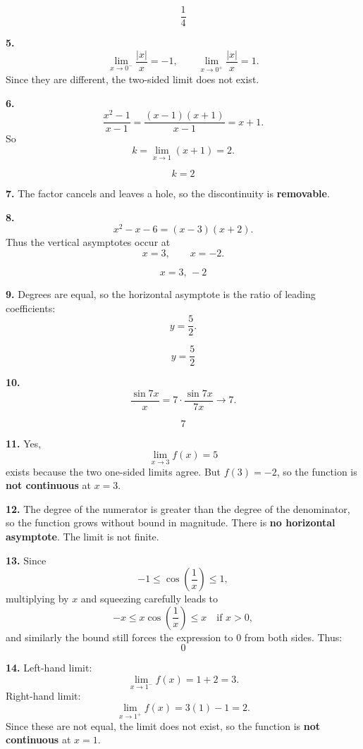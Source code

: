 \documentclass[11pt]{article}
\begin{document}
\[
\boxed{\frac14}
\]

\bigskip

\textbf{5.}
\[
\lim_{x\to 0^-}\frac{|x|}{x}=-1,
\qquad
\lim_{x\to 0^+}\frac{|x|}{x}=1.
\]
Since they are different, the two-sided limit does not exist.

\bigskip

\textbf{6.}
\[
\frac{x^2-1}{x-1}=\frac{(x-1)(x+1)}{x-1}=x+1.
\]
So
\[
k=\lim_{x\to 1}(x+1)=2.
\]

\[
\boxed{k=2}
\]

\bigskip

\textbf{7.}
The factor cancels and leaves a hole, so the discontinuity is \textbf{removable}.

\bigskip

\textbf{8.}
\[
x^2-x-6=(x-3)(x+2).
\]
Thus the vertical asymptotes occur at
\[
x=3,\qquad x=-2.
\]

\[
\boxed{x=3,\,-2}
\]

\bigskip

\textbf{9.}
Degrees are equal, so the horizontal asymptote is the ratio of leading coefficients:
\[
y=\frac52.
\]

\[
\boxed{y=\frac52}
\]

\bigskip

\textbf{10.}
\[
\frac{\sin 7x}{x}
=
7\cdot\frac{\sin 7x}{7x}\to 7.
\]

\[
\boxed{7}
\]

\bigskip

\textbf{11.}
Yes,
\[
\lim_{x\to 3}f(x)=5
\]
exists because the two one-sided limits agree. But $f(3)=-2$, so the function is \textbf{not continuous} at $x=3$.

\bigskip

\textbf{12.}
The degree of the numerator is greater than the degree of the denominator, so the function grows without bound in magnitude. There is \textbf{no horizontal asymptote}. The limit is not finite.

\bigskip

\textbf{13.}
Since
\[
-1\le \cos\left(\frac1x\right)\le 1,
\]
multiplying by $x$ and squeezing carefully leads to
\[
-x\le x\cos\left(\frac1x\right)\le x
\quad\text{if }x>0,
\]
and similarly the bound still forces the expression to $0$ from both sides. Thus:
\[
\boxed{0}
\]

\bigskip

\textbf{14.}
Left-hand limit:
\[
\lim_{x\to 1^-}f(x)=1+2=3.
\]
Right-hand limit:
\[
\lim_{x\to 1^+}f(x)=3(1)-1=2.
\]
Since these are not equal, the limit does not exist, so the function is \textbf{not continuous} at $x=1$.
\end{document}
